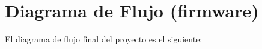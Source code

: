 \section{Diagrama de Flujo  (firmware)}
El diagrama de flujo final del proyecto es el siguiente:



